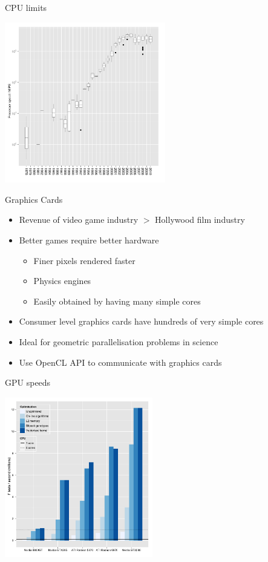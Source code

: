 \documentclass{beamer}
\begin{document}
\begin{frame}{CPU limits}
\begin{center}
\includegraphics[height=7cm]{clockspeed.pdf}
\end{center}
\end{frame}


\begin{frame}{Graphics Cards}
\begin{itemize}
\item Revenue of video game industry $>$ Hollywood film industry
\item Better games require better hardware
\begin{itemize}
\item Finer pixels rendered faster
\item Physics engines
\item Easily obtained by having many simple cores
\end{itemize}
\item Consumer level graphics cards have hundreds of very simple cores
\item Ideal for geometric parallelisation problems in science
\item Use OpenCL API to communicate with graphics cards
\end{itemize}
\end{frame}



\begin{frame}{GPU speeds}
\begin{center}
\includegraphics[height=7cm]{gpuoptimisation.pdf}
\end{center}
\end{frame}
\end{document}
